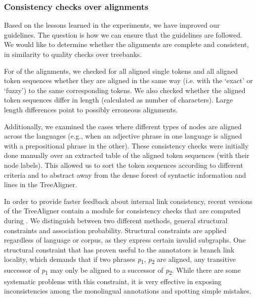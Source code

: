 \documentclass[output=paper]{LSP/langsci}
\begin{document}
\subsubsection{Consistency checks over alignments}\label{sec:volk:2.2.6}

Based on the lessons learned in the  experiments, we have improved our  guidelines. The question is how we can ensure that the guidelines are followed. We would like to determine whether the alignments are complete and consistent, in similarity to quality checks over treebanks. 

For  of the alignments, we checked for all aligned single tokens and all aligned token sequences whether they are aligned in the same way (i.e. with the  `exact' or `fuzzy') to the same corresponding tokens. We also checked whether the aligned token sequences differ in length (calculated as number of characters). Large length differences point to possibly erroneous alignments. 

Additionally, we examined the cases where different types of nodes are aligned across the languages (e.g., when an adjective phrase in one language is aligned with a prepositional phrase in the other). These consistency checks were initially done manually over an extracted table of the aligned token sequences (with their node labels). This allowed us to sort the token sequences according to different criteria and to abstract away from the dense forest of syntactic information and  lines in the TreeAligner. 

In order to provide faster feedback about internal  link consistency, recent versions of the TreeAligner contain a module for consistency checks that are computed during . We distinguish between two different methods, general structural constraints and association probability. Structural constraints are applied regardless of language or corpus, as they express certain invalid subgraphs. One structural constraint that has proven useful to the annotators is branch link locality, which demands that if two phrases \textit{p}\textsubscript{1}, \textit{p}\textsubscript{2} are aligned, any transitive successor of \textit{p}\textsubscript{1} may only be aligned to a successor of \textit{p}\textsubscript{2}. While there are some systematic problems with this constraint, it is very effective in exposing inconsistencies among the monolingual annotations and spotting simple mistakes. 
 
\end{document}
